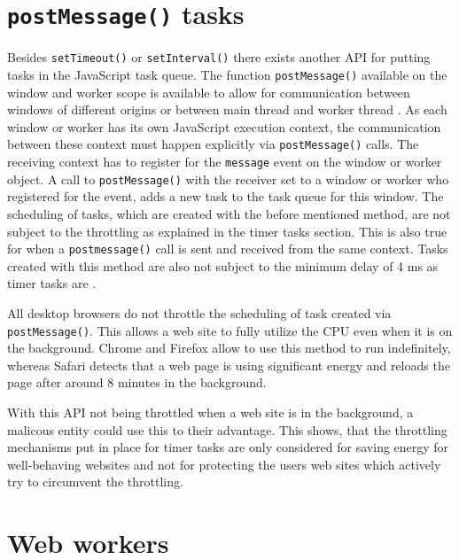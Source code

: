 \documentclass[
	ruledheaders=section,%
	class=report,%
	thesis={type=bachelor},%
	accentcolor=9c,%
	custommargins=true,%
	marginpar=false,%
	parskip=half-,%
	fontsize=11pt,%
]{tudapub}
\begin{document}
  \section{\texttt{postMessage()} tasks}

  Besides \texttt{setTimeout()} or \texttt{setInterval()} there exists another API for putting tasks in the JavaScript task queue. The function \texttt{postMessage()} available on the window and worker scope is available to allow for communication between windows of different origins or between main thread and worker thread \cite{mdn-postmessage}. As each window or worker has its own JavaScript execution context, the communication between these context must happen explicitly via \texttt{postMessage()} calls. The receiving context has to register for the \texttt{message} event on the window or worker object. A call to \texttt{postMessage()} with the receiver set to a window or worker who registered for the event, adds a new task to the task queue for this window. The scheduling of tasks, which are created with the before mentioned method, are not subject to the throttling as explained in the timer tasks section. This is also true for when a \texttt{postmessage()} call is sent and received from the same context. Tasks created with this method are also not subject to the minimum delay of 4 ms as timer tasks are \cite{zero-delay-timeouts}.

  All desktop browsers do not throttle the scheduling of task created via \texttt{postMessage()}. This allows a web site to fully utilize the CPU even when it is on the background. Chrome and Firefox allow to use this method to run indefinitely, whereas Safari detects that a web page is using significant energy and reloads the page after around 8 minutes in the background.

  With this API not being throttled when a web site is in the background, a malicous entity could use this to their advantage. This shows, that the throttling mechanisms put in place for timer tasks are only considered for saving energy for well-behaving websites and not for protecting the users web sites which actively try to circumvent the throttling.
  

  
  \section{Web workers}
\end{document}
